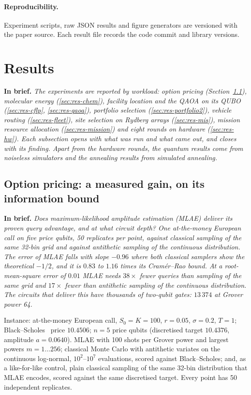 \documentclass[11pt,a4paper]{article}
\newcommand{\inbrief}[1]{\par\smallskip\noindent\textbf{In brief.} \emph{#1}\par\medskip}
\begin{document}
\paragraph{Reproducibility.} Experiment scripts, raw JSON results and figure
generators are versioned with the paper source. Each result file records the
code commit and library versions.

\section{Results}
\label{sec:results}

\inbrief{The experiments are reported by workload: option pricing
(Section~\ref{sec:res-mc}), molecular energy (\ref{sec:res-chem}), facility
location and the QAOA on its QUBO (\ref{sec:res-cflp},
\ref{sec:res-qaoa}), portfolio selection
(\ref{sec:res-portfolio2}), vehicle routing
(\ref{sec:res-fleet}), site selection on Rydberg arrays
(\ref{sec:res-mis}), mission resource allocation (\ref{sec:res-mission})
and eight rounds on hardware (\ref{sec:res-hw}). Each subsection opens with
what was run and what came out, and closes with its finding. Apart from the
hardware rounds, the quantum results come from noiseless simulators and the
annealing results from simulated annealing.}

\subsection{Option pricing: a measured gain, on its information bound}
\label{sec:res-mc}

\inbrief{Does maximum-likelihood amplitude estimation (MLAE) deliver its
proven query advantage, and at what circuit depth? One at-the-money European
call on five price qubits, 50 replicates per point, against classical
sampling of the same 32-bin grid and against antithetic sampling of the
continuous distribution. The error of MLAE falls with slope $-0.96$ where
both classical samplers show the theoretical $-1/2$, and it is $0.83$ to
$1.16$ times its Cram\'er--Rao bound. At a root-mean-square error of $0.01$
MLAE needs $38\times$ fewer queries than sampling of the same grid and
$17\times$ fewer than antithetic sampling of the continuous distribution.
The circuits that deliver this have thousands of two-qubit gates:
$13\,374$ at Grover power 64.}

Instance: at-the-money European call, $S_0 = K = 100$, $r = 0.05$,
$\sigma = 0.2$, $T = 1$; Black--Scholes~\cite{blackscholes1973} price
$10.4506$; $n = 5$ price qubits (discretised target $10.4376$, amplitude
$a = 0.0640$). MLAE with 100 shots per Grover power and largest powers
$m = 1\dots256$; classical Monte Carlo with antithetic variates on the
continuous log-normal, $10^2$--$10^7$ evaluations, scored against
Black--Scholes; and, as a like-for-like control, plain classical sampling of
the same 32-bin distribution that MLAE encodes, scored against the same
discretised target. Every point has 50 independent replicates.
\end{document}
